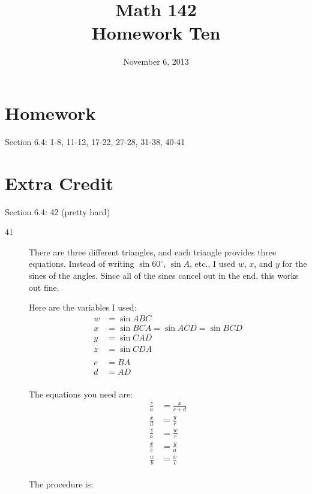 \documentclass{exam}
\author{}
\date{November 6, 2013}
\title{Math 142 \\ Homework Ten}
\newcommand{\dg}{\ensuremath{^\circ}}
\begin{document}
  \maketitle

  \section{Homework}
  Section 6.4: 1-8, 11-12, 17-22, 27-28, 31-38, 40-41

  \section{Extra Credit}
  Section 6.4: 42 (pretty hard)

  \ifprintanswers

  \begin{description}
    \item[41]

      There are three different triangles, and each triangle provides three equations.  Instead of writing 
      $\sin 60 \dg$, $\sin A$, etc., I used $w$, $x$, and $y$ for the sines of the angles.  Since all of the sines
      cancel out in the end, this works out fine.

      Here are the variables I used:
      \begin{align*}
        w &= \sin ABC \\
        x &= \sin BCA = \sin ACD = \sin BCD \\
        y &= \sin CAD \\
        z &= \sin CDA \\
        \\
        c &= BA \\
        d &= AD \\
      \end{align*}

      The equations you need are:
      \begin{align*}
        \frac{z}{a} &= \frac{x}{c + d} \\
        \frac{x}{d} &= \frac{y}{r} \\
        \frac{z}{a} &= \frac{w}{r} \\
        \frac{x}{c} &= \frac{y}{a} \\
        \frac{w}{b} &= \frac{x}{c} \\
      \end{align*}

      The procedure is:


\end{description}
\end{document}
